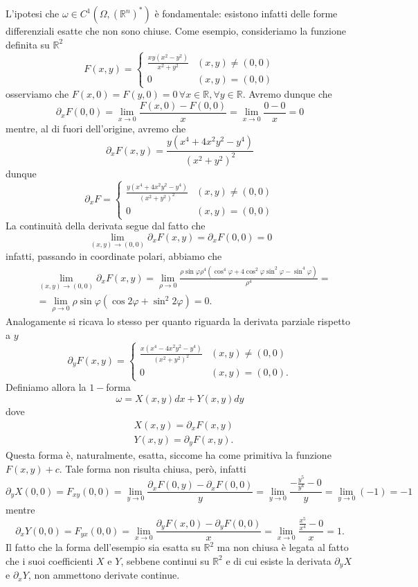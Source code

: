 \begin{remark}
	L'ipotesi che $\omega \in C^1(\Omega, (\mathbb{R}^n)^*)$ è fondamentale: esistono infatti delle forme differenziali esatte che non sono chiuse. Come esempio, consideriamo la funzione definita su $\mathbb{R}^2$
	$$
	F(x, y) = \begin{cases}
		\frac{xy(x^2 - y^2)}{x^2 + y^2} & (x, y) \neq (0, 0) \\
		0 & (x, y) = (0, 0)
	\end{cases}
	$$
	osserviamo che $F(x, 0) = F(y, 0) = 0 \, \forall x \in \mathbb{R}, \forall y \in \mathbb{R}$. Avremo dunque che
	$$
	\partial_x F(0, 0) = \lim_{x \to 0} \frac{F(x, 0) - F(0, 0)}{x} = \lim_{x \to 0} \frac{0 - 0}{x} = 0
	$$
	mentre, al di fuori dell'origine, avremo che
	$$
	\partial_x F(x, y) = \frac{y(x^4 + 4x^2 y^2 - y^4)}{(x^2 + y^2)^2}
	$$
	dunque
	$$
	\partial_x F = \begin{cases}
		\frac{y(x^4 + 4x^2 y^2 - y^4)}{(x^2 + y^2)^2} & (x, y) \neq (0, 0) \\
		0 & (x, y) = (0, 0)
	\end{cases}
	$$
	La continuità della derivata segue dal fatto che
	$$
	\lim_{(x, y) \to (0, 0)} \partial_x F(x, y) = \partial_x F(0, 0) = 0
	$$
	infatti, passando in coordinate polari, abbiamo che
	\begin{align*}
	&\lim_{(x, y) \to (0, 0)} \partial_x F(x, y) = \lim_{\rho \to 0} \frac{\rho \sin{\varphi} \rho^4 (\cos^4{\varphi} + 4 \cos^2{\varphi} \sin^2{\varphi} - \sin^4{\varphi})}{\rho^4} = \\
	&=\lim_{\rho \to 0} \rho \sin{\varphi}(\cos{2\varphi} + \sin^2{2\varphi}) = 0.
	\end{align*}
	Analogamente si ricava lo stesso per quanto riguarda la derivata parziale rispetto a $y$
	$$
	\partial_y F(x, y) = \begin{cases}
		\frac{x(x^4 - 4x^2 y^2 - y^4)}{(x^2 + y^2)^2} & (x, y) \neq (0, 0) \\
		0 & (x, y) = (0, 0).
	\end{cases}
	$$
	Definiamo allora la $1-$forma
	$$
	\omega = X(x, y)dx + Y(x, y)dy
	$$
	dove
	\begin{align*}
		&X(x, y) = \partial_x F(x, y) \\
		&Y(x, y) = \partial_y F(x, y).
	\end{align*}
	Questa forma è, naturalmente, esatta, siccome ha come primitiva la funzione $F(x, y) + c$. Tale forma non risulta chiusa, però, infatti
	$$
	\partial_y X(0, 0) = F_{xy}(0, 0) = \lim_{y \to 0} \frac{\partial_x F(0, y) - \partial_x F(0, 0)}{y} = \lim_{y \to 0} \frac{-\frac{y^5}{y^4} - 0}{y} = \lim_{y \to 0} (-1) = -1 
	$$
	mentre
	$$
	\partial_x Y(0, 0) = F_{yx}(0, 0) = \lim_{x \to 0} \frac{\partial_y F(x, 0) - \partial_y F(0, 0)}{x} = \lim_{x \to 0} \frac{\frac{x^5}{x^4}-0}{x} = 1.
	$$
	Il fatto che la forma dell'esempio sia esatta su $\mathbb{R}^2$ ma non chiusa è legata al fatto che i suoi coefficienti $X$ e $Y$, sebbene continui su $\mathbb{R}^2$ e di cui esiste la derivata $\partial_y X$ e $\partial_x Y$, non ammettono derivate continue. 
\end{remark}


